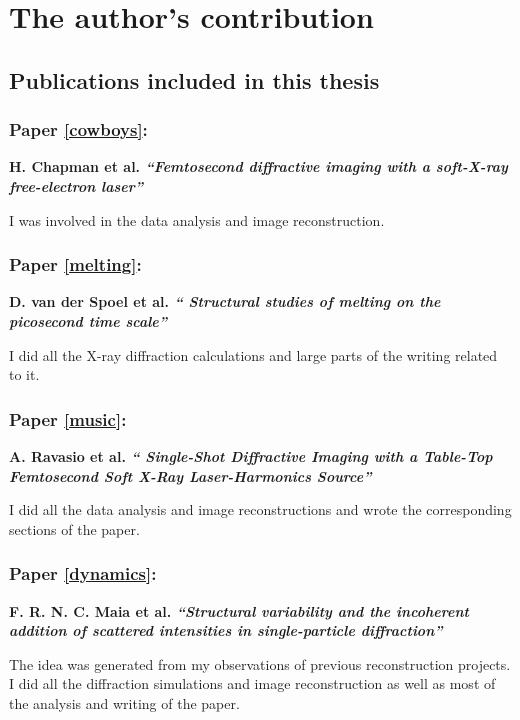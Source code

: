 \chapter*{The author's contribution}

\section*{Publications included in this thesis}

\vspace{1cm}

\subsection*{Paper \ref{cowboys}:}{\bf H. Chapman et al. \noindent
{\em ``Femtosecond diffractive imaging with a soft-X-ray free-electron laser''}}

\noindent
I was involved in the data analysis and image reconstruction.

\noindent
\subsection*{Paper \ref{melting}:}{\bf D. van der Spoel et al. {\em ``
 Structural studies of melting on the picosecond time scale''}}

\noindent I did all the X-ray diffraction calculations and large parts of
the writing related to it.

\noindent
\subsection*{Paper \ref{music}:}{\bf A. Ravasio et al. {\em `` 
Single-Shot Diffractive Imaging with a Table-Top
      Femtosecond Soft X-Ray Laser-Harmonics Source''}}

\noindent I did all the data analysis and  image reconstructions and wrote the corresponding sections of the paper.

\noindent
\subsection*{Paper \ref{dynamics}:}{\bf F. R. N. C. Maia et al. {\em ``Structural variability and the incoherent addition of scattered
      intensities in single-particle diffraction''}}

\noindent The idea was generated from my observations of previous reconstruction
projects. I did all the diffraction simulations and image reconstruction as well
as most of the analysis and writing of the paper.

